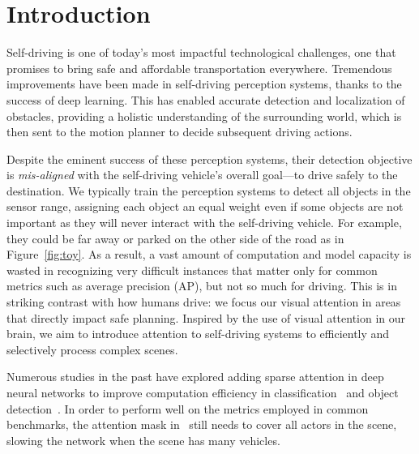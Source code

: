 
\section{Introduction}
Self-driving is one of today's most impactful technological challenges, one that promises to bring
safe and affordable  transportation everywhere. Tremendous improvements have been made
in self-driving perception systems, thanks to the success of deep learning. This has enabled
accurate detection and localization of obstacles, providing a holistic understanding of the
surrounding world, which is then sent to the motion planner to decide subsequent driving actions.

Despite the eminent success of these perception systems, their detection
objective is \textit{mis-aligned} with the self-driving vehicle's overall goal---to drive
safely to the destination. We typically train the perception systems to detect all objects in
the sensor range, assigning each object an equal weight even if some objects are not important
as they will never interact with the self-driving vehicle. For example, they could be far away or
parked on the other side of the road as in Figure~\ref{fig:toy}.
As a result, a vast amount of computation and model capacity is wasted in recognizing
very difficult instances that matter only for common metrics such as average precision (AP), but not
so much for driving.
This is in
striking contrast with how humans drive: we focus our visual attention in areas that directly impact
safe planning. 
Inspired by the use of visual attention in our brain, we aim to introduce attention to self-driving systems to efficiently and selectively process complex scenes.

Numerous studies in the past have explored adding sparse attention in deep neural networks to
improve computation efficiency in  classification~\cite{resattn,adaptivecomp} and object
detection~\cite{sbnet,progressivesparse,recattend}. 
In order to perform well on the metrics employed in common benchmarks, the
attention mask in~\cite{sbnet} still needs to cover all actors in the scene, slowing the network when the scene has many vehicles.

